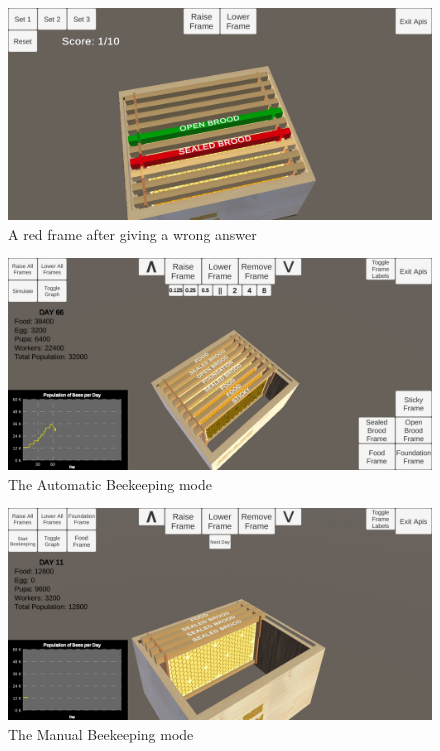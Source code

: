 \documentclass[journal]{./IEEE/IEEEtran}
\begin{document}
\begin{figure}[H]
\includegraphics[scale=0.17]{./images/quiz-game-3.jpg}
\centering
\caption{A red frame after giving a wrong answer}
\end{figure}

\begin{figure}[H]
\includegraphics[scale=0.17]{./images/automatic-beekeeping-new.jpg}
\centering
\caption{The Automatic Beekeeping mode}
\end{figure}

\begin{figure}[H]
\includegraphics[scale=0.17]{./images/manual-beekeeping-new.jpg}
\centering
\caption{The Manual Beekeeping mode}
\end{figure}
\end{document}
